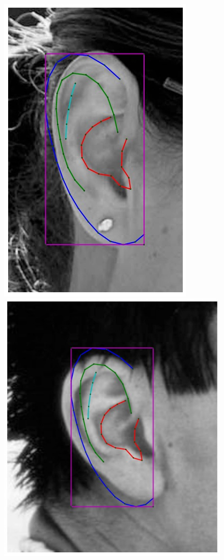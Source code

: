 \begin{figure}[!t]
    \\
    \newcommand{\flowhh}{0.265\columnwidth}
    \includegraphics[height=\flowhh]{resources/Ear_Deformable_Model/fittings/initial_0012}
    \includegraphics[height=\flowhh]{resources/Ear_Deformable_Model/fittings/initial_0022}

\end{figure}
